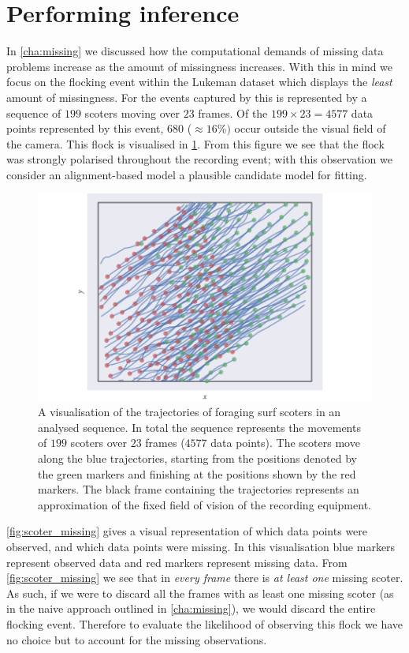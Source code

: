 \section{Performing inference}

In \cref{cha:missing} we discussed how the computational demands of missing
data problems increase as the amount of missingness increases. With this in
mind we focus on the flocking event within the Lukeman dataset which displays
the \emph{least} amount of missingness. For the events captured by
\textcite{lukeman10} this is represented by a sequence of $199$ scoters moving
over $23$ frames. Of the $199\times23=4577$ data points represented by this
event, $680$ ($\approx16\%)$ occur outside the visual field of the camera. This
flock is visualised in \cref{fig:scoter_traj}. From this figure we see that the
flock was strongly polarised throughout the recording event; with this
observation we consider an alignment-based model a plausible candidate model
for fitting.

\begin{figure}[tb]
  \includegraphics{data_00_traj.pdf}
  \caption{A visualisation of the trajectories of foraging surf scoters in an
    analysed sequence. In total the sequence represents the movements of
    $199$ scoters over $23$ frames ($4577$ data points). The scoters move
    along the blue trajectories, starting from the positions denoted by the
    green markers and finishing at the positions shown by the red markers. The
    black frame containing the trajectories represents an approximation of the
    fixed field of vision of the recording equipment.}
  \label{fig:scoter_traj}
\end{figure}

\cref{fig:scoter_missing} gives a visual representation of which data points
were observed, and which data points were missing. In this visualisation blue
markers represent observed data and red markers represent missing data. From
\cref{fig:scoter_missing} we see that in \emph{every frame} there is \emph{at
least one} missing scoter. As such, if we were to discard all the frames with
as least one missing scoter (as in the naive approach outlined in
\cref{cha:missing}), we would discard the entire flocking event. Therefore to
evaluate the likelihood of observing this flock we have no choice but to
account for the missing observations.

